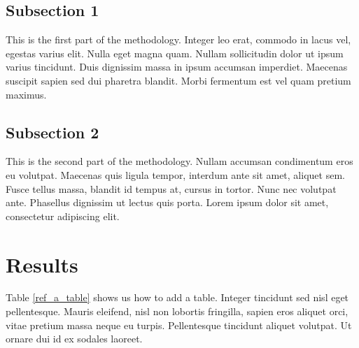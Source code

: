 \documentclass[12pt,turkish,a4paperpaper,]{report}
\begin{document}
\hypertarget{subsection-1-1}{%
\subsection{Subsection 1}\label{subsection-1-1}}

This is the first part of the methodology. Integer leo erat, commodo in
lacus vel, egestas varius elit. Nulla eget magna quam. Nullam
sollicitudin dolor ut ipsum varius tincidunt. Duis dignissim massa in
ipsum accumsan imperdiet. Maecenas suscipit sapien sed dui pharetra
blandit. Morbi fermentum est vel quam pretium maximus.

\hypertarget{subsection-2-2}{%
\subsection{Subsection 2}\label{subsection-2-2}}

This is the second part of the methodology. Nullam accumsan condimentum
eros eu volutpat. Maecenas quis ligula tempor, interdum ante sit amet,
aliquet sem. Fusce tellus massa, blandit id tempus at, cursus in tortor.
Nunc nec volutpat ante. Phasellus dignissim ut lectus quis porta. Lorem
ipsum dolor sit amet, consectetur adipiscing elit.

\hypertarget{results-2}{%
\section{Results}\label{results-2}}

Table \ref{ref_a_table} shows us how to add a table. Integer tincidunt
sed nisl eget pellentesque. Mauris eleifend, nisl non lobortis
fringilla, sapien eros aliquet orci, vitae pretium massa neque eu
turpis. Pellentesque tincidunt aliquet volutpat. Ut ornare dui id ex
sodales laoreet.

\newpage
\end{document}
